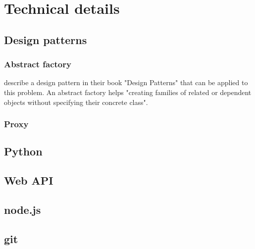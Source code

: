 
\section{Technical details}

\subsection{Design patterns}

\subsubsection{Abstract factory}
\label{sec:abstractfactory}
\citeauthor{gamma:1993} describe a design pattern in their book "Design Patterns" that can be applied to this problem.
An abstract factory helps "creating families of related or dependent objects without specifying their concrete class"\citep[p.~99]{gamma:1993}.\\

\subsubsection{Proxy}

\subsection{Python}

\subsection{Web API}

\subsection{node.js}

\subsection{git}


